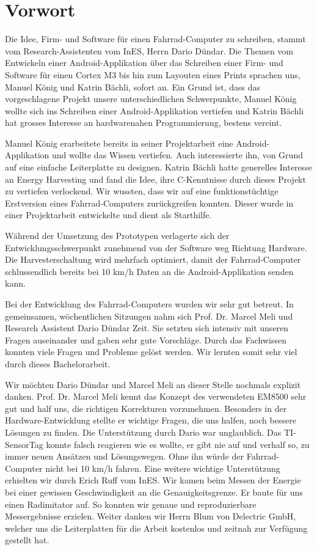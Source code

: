 \chapter{Vorwort}

Die Idee, Firm- und Software für einen Fahrrad-Computer zu schreiben, stammt vom Research-Assistenten vom InES, Herrn Dario Dündar. Die Themen vom Entwickeln einer Android-Applikation über das Schreiben einer Firm- und Software für einen Cortex M3 bis hin zum Layouten eines Prints sprachen uns, Manuel König und Katrin Bächli, sofort an. Ein Grund ist, dass das vorgeschlagene Projekt unsere unterschiedlichen Schwerpunkte, Manuel König wollte sich ins Schreiben einer Android-Applikation vertiefen und Katrin Bächli hat grosses Interesse an hardwarenahen Programmierung, bestens vereint.  

Manuel König erarbeitete bereits in seiner Projektarbeit eine Android-Applikation und wollte das Wissen vertiefen. Auch interessierte ihn, von Grund auf eine einfache Leiterplatte zu designen. Katrin Bächli hatte generelles Interesse an Energy Harvesting und fand die Idee, ihre C-Kenntnisse durch dieses Projekt zu vertiefen verlockend. Wir wussten, dass wir auf eine funktionstüchtige Erstversion eines Fahrrad-Computers zurückgreifen konnten. Dieser wurde in einer Projektarbeit entwickelte und dient als Starthilfe.

Während der Umsetzung des Prototypen verlagerte sich der Entwicklungsschwerpunkt zunehmend von der Software weg Richtung Hardware. Die Harvesterschaltung wird mehrfach optimiert, damit der Fahrrad-Computer schlussendlich bereits bei 10 km/h Daten an die Android-Applikation senden kann.

Bei der Entwicklung des Fahrrad-Computers wurden wir sehr gut betreut. In gemeinsamen, wöchentlichen Sitzungen nahm sich Prof. Dr. Marcel Meli und Research Assistent Dario Dündar Zeit. Sie setzten sich intensiv mit unseren Fragen auseinander und gaben sehr gute Vorschläge. Durch das Fachwissen konnten viele Fragen und Probleme gelöst werden. Wir lernten somit sehr viel durch dieses Bachelorarbeit. 

Wir möchten Dario Dündar und Marcel Meli an dieser Stelle nochmals explizit danken. Prof. Dr. Marcel Meli kennt das Konzept des verwendeten EM8500 sehr gut und half uns, die richtigen Korrekturen vorzunehmen. Besonders in der Hardware-Entwicklung stellte er wichtige Fragen, die uns halfen, noch bessere Lösungen zu finden. Die Unterstützung durch Dario war unglaublich. Das TI-SensorTag konnte falsch reagieren wie es wollte, er gibt nie auf und verhalf so, zu immer neuen Ansätzen und Lösungswegen. Ohne ihn würde der Fahrrad-Computer nicht bei 10 km/h fahren. Eine weitere wichtige Unterstützung erhielten wir durch Erich Ruff vom InES. Wir kamen beim Messen der Energie bei einer gewissen Geschwindigkeit an die Genauigkeitsgrenze. Er baute für uns einen Radimitator auf. So konnten wir genaue und reproduzierbare Messergebnisse erzielen. Weiter danken wir Herrn Blum von Delectric GmbH, welcher uns die Leiterplatten für die Arbeit kostenlos und zeitnah zur Verfügung gestellt hat.

